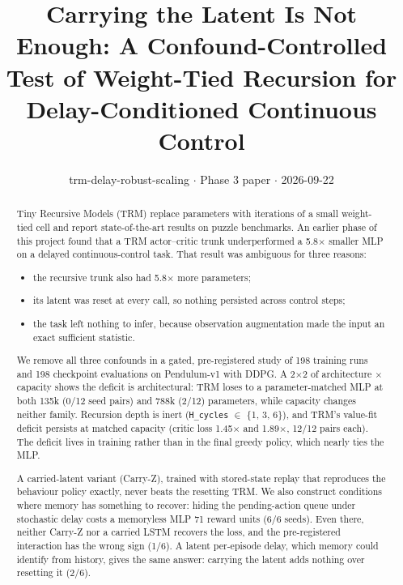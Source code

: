 \documentclass[11pt]{article}
\title{Carrying the Latent Is Not Enough: A Confound-Controlled Test of Weight-Tied Recursion for Delay-Conditioned Continuous Control}
\author{}
\date{trm-delay-robust-scaling $\cdot$ Phase 3 paper $\cdot$ 2026-09-22}
\begin{document}
\maketitle
\begin{abstract}



Tiny Recursive Models (TRM) replace parameters with iterations of a small weight-tied cell and report state-of-the-art results on puzzle benchmarks. An earlier phase of this project found that a TRM actor--critic trunk underperformed a 5.8$\times$ smaller MLP on a delayed continuous-control task. That result was ambiguous for three reasons:

\begin{itemize}
\item the recursive trunk also had 5.8$\times$ more parameters;
\item its latent was reset at every call, so nothing persisted across control steps;
\item the task left nothing to infer, because observation augmentation made the input an exact sufficient statistic.
\end{itemize}



We remove all three confounds in a gated, pre-registered study of 198 training runs and 198 checkpoint evaluations on Pendulum-v1 with DDPG. A 2$\times$2 of architecture $\times$ capacity shows the deficit is architectural: TRM loses to a parameter-matched MLP at both 135k (0/12 seed pairs) and 788k (2/12) parameters, while capacity changes neither family. Recursion depth is inert (\texttt{H\_cycles} $\in$ \{1, 3, 6\}), and TRM's value-fit deficit persists at matched capacity (critic loss 1.45$\times$ and 1.89$\times$, 12/12 pairs each). The deficit lives in training rather than in the final greedy policy, which nearly ties the MLP.



A carried-latent variant (Carry-Z), trained with stored-state replay that reproduces the behaviour policy exactly, never beats the resetting TRM. We also construct conditions where memory has something to recover: hiding the pending-action queue under stochastic delay costs a memoryless MLP 71 reward units (6/6 seeds). Even there, neither Carry-Z nor a carried LSTM recovers the loss, and the pre-registered interaction has the wrong sign (1/6). A latent per-episode delay, which memory could identify from history, gives the same answer: carrying the latent adds nothing over resetting it (2/6).




\end{abstract}
\end{document}
